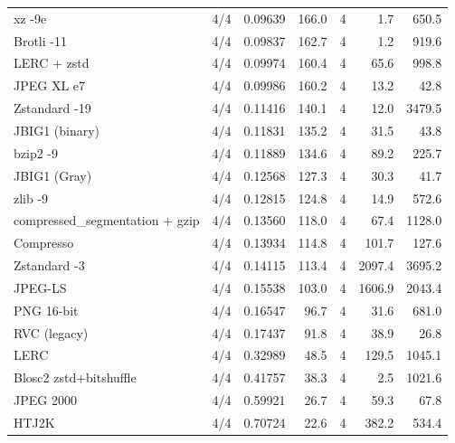 \begin{table}[t]
\begin{tabular}{lrrrrrr}
xz -9e & 4/4 & 0.09639 & 166.0 & 4 & 1.7 & 650.5 \\
Brotli -11 & 4/4 & 0.09837 & 162.7 & 4 & 1.2 & 919.6 \\
LERC + zstd & 4/4 & 0.09974 & 160.4 & 4 & 65.6 & 998.8 \\
JPEG XL e7 & 4/4 & 0.09986 & 160.2 & 4 & 13.2 & 42.8 \\
Zstandard -19 & 4/4 & 0.11416 & 140.1 & 4 & 12.0 & 3479.5 \\
JBIG1 (binary) & 4/4 & 0.11831 & 135.2 & 4 & 31.5 & 43.8 \\
bzip2 -9 & 4/4 & 0.11889 & 134.6 & 4 & 89.2 & 225.7 \\
JBIG1 (Gray) & 4/4 & 0.12568 & 127.3 & 4 & 30.3 & 41.7 \\
zlib -9 & 4/4 & 0.12815 & 124.8 & 4 & 14.9 & 572.6 \\
compressed\_segmentation + gzip & 4/4 & 0.13560 & 118.0 & 4 & 67.4 & 1128.0 \\
Compresso & 4/4 & 0.13934 & 114.8 & 4 & 101.7 & 127.6 \\
Zstandard -3 & 4/4 & 0.14115 & 113.4 & 4 & 2097.4 & 3695.2 \\
JPEG-LS & 4/4 & 0.15538 & 103.0 & 4 & 1606.9 & 2043.4 \\
PNG 16-bit & 4/4 & 0.16547 & 96.7 & 4 & 31.6 & 681.0 \\
RVC (legacy) & 4/4 & 0.17437 & 91.8 & 4 & 38.9 & 26.8 \\
LERC & 4/4 & 0.32989 & 48.5 & 4 & 129.5 & 1045.1 \\
Blosc2 zstd+bitshuffle & 4/4 & 0.41757 & 38.3 & 4 & 2.5 & 1021.6 \\
JPEG 2000 & 4/4 & 0.59921 & 26.7 & 4 & 59.3 & 67.8 \\
HTJ2K & 4/4 & 0.70724 & 22.6 & 4 & 382.2 & 534.4 \\
\hline
\end{tabular}
\end{table}
